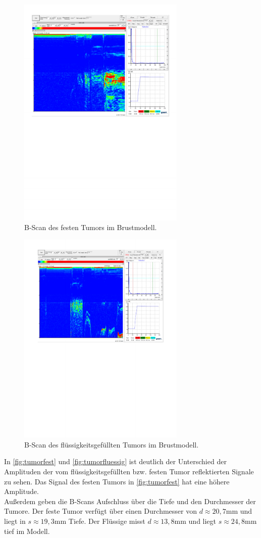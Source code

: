 \begin{figure}[H]
  \centering
  \includegraphics[width = 8cm]{content/festtumor.pdf}
  \caption{B-Scan des festen Tumors im Brustmodell.}
  \label{fig:tumorfest}
\end{figure}
\begin{figure}[H]
  \centering
  \includegraphics[width = 8cm]{content/wassertumor.pdf}
  \caption{B-Scan des flüssigkeitsgefüllten Tumors im Brustmodell.}
  \label{fig:tumorfluessig}
\end{figure}

In \autoref{fig:tumorfest} und \autoref{fig:tumorfluessig} ist deutlich der Unterschied 
der Amplituden der vom flüssigkeitsgefüllten bzw. festen Tumor reflektierten Signale zu sehen.
Das Signal des festen Tumors in \autoref{fig:tumorfest} hat eine höhere 
Amplitude. \\
Außerdem geben die B-Scans Aufschluss über die Tiefe und den Durchmesser der Tumore.
Der feste Tumor verfügt über einen Durchmesser von $d \approx 20,7$mm und liegt in $s \approx 19,3$mm Tiefe.
Der Flüssige misst $d \approx 13,8$mm und liegt $s \approx  24,8$mm tief im Modell.

